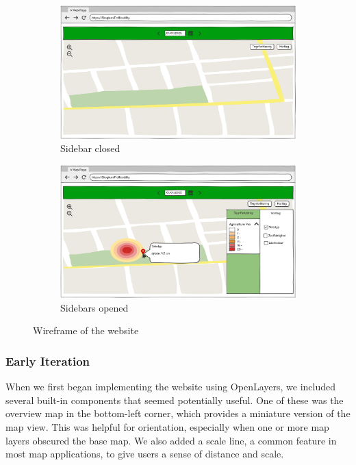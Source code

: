 \begin{figure}[h]
     \centering
     \begin{subfigure}[b]{0.45\textwidth}
         \centering
         \includegraphics[width=\textwidth]{figures/wireframe_website_sidebars_closed.pdf}
         \caption{Sidebar closed}
         \label{fig:wireframe:closed}
     \end{subfigure}
     \hfill
     \begin{subfigure}[b]{0.45\textwidth}
         \centering
         \includegraphics[width=\textwidth]{figures/wireframe_website_sidebars_opened.pdf}
         \caption{Sidebars opened}
         \label{fig:wireframe:opened}
     \end{subfigure}
    \caption{Wireframe of the website}
    \label{fig:wireframe}
\end{figure}

\subsubsection*{Early Iteration}

When we first began implementing the website using OpenLayers, we included several built-in components that seemed potentially useful. One of these was the overview map in the bottom-left corner, which provides a miniature version of the map view. This was helpful for orientation, especially when one or more map layers obscured the base map. We also added a scale line, a common feature in most map applications, to give users a sense of distance and scale.

